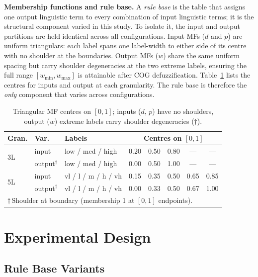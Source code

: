 \documentclass[runningheads]{llncs}
\begin{document}
\textbf{Membership functions and rule base.} A \emph{rule base} is the table that assigns one output linguistic term to every combination of input linguistic terms; it is the structural component varied in this study. To isolate it, the input and output partitions are held identical across all configurations. Input MFs ($d$ and $p$) are uniform triangulars: each label spans one label-width to either side of its centre with no shoulder at the boundaries. Output MFs ($w$) share the same uniform spacing but carry shoulder degeneracies at the two extreme labels, ensuring the full range $[w_{\min}, w_{\max}]$ is attainable after COG defuzzification. Table~\ref{tab:mf} lists the centres for inputs and output at each granularity. 
The rule base is therefore the \emph{only} component that varies across configurations.



\begin{table}[H]
\scriptsize
\centering
\caption{Triangular MF centres on $[0,1]$; inputs ($d$, $p$) have no shoulders, output ($w$) extreme labels carry shoulder degeneracies ($\dagger$).}\label{tab:mf}
\setlength{\tabcolsep}{4pt}
\begin{tabular}{lll ccccc}
\toprule
Gran. & Var. & Labels & \multicolumn{5}{c}{Centres on $[0,1]$} \\
\midrule
\multirow{2}{*}{3L} & input   & low / med / high    & 0.20 & 0.50 & 0.80 & ---  & ---  \\
                    & output$^\dagger$ & low / med / high    & 0.00 & 0.50 & 1.00 & ---  & ---  \\
\midrule
\multirow{2}{*}{5L} & input   & vl / l / m / h / vh & 0.15 & 0.35 & 0.50 & 0.65 & 0.85 \\
                    & output$^\dagger$ & vl / l / m / h / vh & 0.00 & 0.33 & 0.50 & 0.67 & 1.00 \\
\bottomrule
\multicolumn{8}{l}{\footnotesize $\dagger$\,Shoulder at boundary (membership 1 at $[0,1]$ endpoints).}
\end{tabular}
\end{table}



\section{Experimental Design}\label{sec:experiments}

\subsection{Rule Base Variants}\label{sec:rule_variants}
\end{document}
